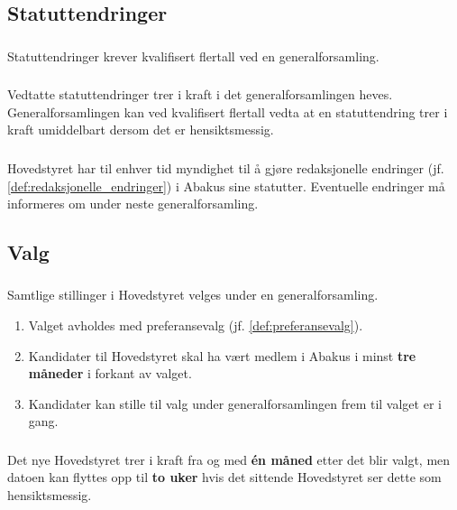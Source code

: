 \subsection{Statuttendringer}
\subsubsection{}
Statuttendringer krever kvalifisert flertall ved en generalforsamling.

\subsubsection{}
Vedtatte statuttendringer trer i kraft i det generalforsamlingen heves. Generalforsamlingen kan ved kvalifisert 
flertall vedta at en statuttendring trer i kraft umiddelbart dersom det er hensiktsmessig.

\subsubsection{}
Hovedstyret har til enhver tid myndighet til å gjøre redaksjonelle endringer (jf. \ref{def:redaksjonelle_endringer}) i
 Abakus sine statutter. Eventuelle endringer må informeres om under neste generalforsamling.

\subsection{Valg}
\subsubsection{}\label{subsec:genfors_valg}
Samtlige stillinger i Hovedstyret velges under en generalforsamling.
\begin{enumerate}[label=\alph*)]
    \item Valget avholdes med preferansevalg (jf. \ref{def:preferansevalg}). 
    \item Kandidater til Hovedstyret skal ha vært medlem i Abakus i minst \textbf{tre måneder} i forkant av valget. 
    \item Kandidater kan stille til valg under generalforsamlingen frem til valget er i gang. 
\end{enumerate}

\subsubsection{}
Det nye Hovedstyret trer i kraft fra og med \textbf{én måned} etter det blir valgt, men datoen kan 
flyttes opp til \textbf{to uker} hvis det sittende Hovedstyret ser dette som hensiktsmessig.

